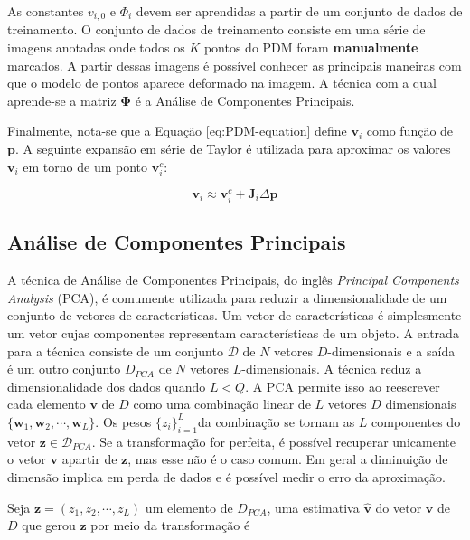 {As constantes $v_{i,0}$ e $\Phi_i$ devem ser aprendidas a partir de um conjunto
de dados de treinamento. O conjunto de dados de treinamento consiste em uma
série de imagens anotadas onde todos os $K$ pontos do PDM foram
\textbf{manualmente} marcados. A partir dessas imagens é possível conhecer as
principais maneiras com que o modelo de pontos aparece deformado na imagem. A
técnica com a qual aprende-se a matriz $\bm{\Phi}$ é a Análise de Componentes
Principais.

Finalmente, nota-se que a Equação \ref{eq:PDM-equation} define $\mathbf{v}_i$
como função de $\mathbf{p}$. A seguinte expansão em série de Taylor é utilizada
para aproximar os valores $\mathbf{v}_i$ em torno de um ponto $\mathbf{v}_i^c$:

\begin{equation}
\mathbf{v}_i \approx \mathbf{v}_i^c + \mathbf{J}_i \Delta \mathbf{p}
\label{eq:alg2}
\end{equation}


\subsection{Análise de Componentes Principais}

A técnica de Análise de Componentes Principais, do inglês
 \textit{Principal
Components Analysis} (PCA), é comumente utilizada para reduzir a dimensionalidade
de um conjunto de vetores de características. Um vetor de características é
simplesmente um vetor cujas componentes representam características de um
objeto.  A entrada para a técnica consiste de um conjunto $\mathcal{D}$ de $N$
vetores $D$-dimensionais e a saída é um outro conjunto $D_{PCA}$ de $N$ vetores
$L$-dimensionais. A técnica reduz a dimensionalidade dos dados quando $L < Q$. A
PCA permite isso ao reescrever cada elemento $\bm{v}$ de $D$ como uma combinação
linear de $L$ vetores $D$ dimensionais $\{ \mathbf{w}_1, \mathbf{w}_2, \cdots,
\mathbf{w}_L\}$.  Os pesos $\{z_i\}_{i=1}^L$da combinação se tornam as $L$
componentes do vetor $\mathbf{z} \in \mathcal{D}_{PCA}$. Se a transformação for
perfeita, é possível recuperar unicamente o vetor $\mathbf{v}$ apartir de
$\mathbf{z}$, mas esse não é o caso comum. Em geral a diminuição de dimensão
implica em perda de dados e é possível medir o erro da aproximação. 

Seja $\mathbf{z} = (z_1, z_2, \cdots, z_L)$ um elemento de $D_{PCA}$, uma
estimativa $\mathbf{\hat{v}}$ do vetor $\mathbf{v}$ de $D$ que gerou
$\mathbf{z}$ por meio da transformação é

}
